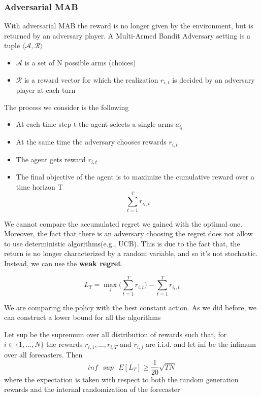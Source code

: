 \documentclass[main.tex]{subfiles}
\begin{document}
\subsubsection{Adversarial MAB}
With adversarial MAB the reward is no longer given by the environment, but is returned by an adversary player. A Multi-Armed Bandit Adversary setting is a tuple $\langle \mathcal{A}, \mathcal{R} \rangle$
\begin{itemize}
    \item $\mathcal{A}$ is a set of N possible arms (choices)
    \item $\mathcal{R}$ is a reward vector for which the realization $r_{i,t}$ is decided by an adversary player at each turn
\end{itemize}
The process we consider is the following
\begin{itemize}
    \item At each time step t the agent selects a single arms $a_{i_t}$
    \item At the same time the adversary chooses rewards $r_{i,t}$
    \item The agent gets reward $r_{i,t}$
    \item The final objective of the agent is to maximize the cumulative reward over a time horizon T
    \begin{equation*}
        \sum_{t=1}^T r_{i_t,t}
    \end{equation*}
\end{itemize}
We cannot compare the accumulated regret we gained with the optimal one. Moreover, the fact that there is an adversary choosing the regret does not allow to use deterministic algorithms(e.g., UCB). This is due to the fact that, the return is no longer characterized by a random variable, and so it's not stochastic. Instead, we can use the \textbf{weak regret}.
\begin{definition}
\begin{equation*}
    L_T = \max_i \bigg( \sum_{t=1}^T r_{i,t} \bigg) - \sum_{t=1}^T r_{i_t,t}
\end{equation*}
\end{definition}
We are comparing the policy with the best constant action.
As we did before, we can construct a lower bound for all the algorithms
\begin{theorem}
Let sup be the supremum over all distribution of rewards such that, for $i \in \{ 1, \dots, N \}$ the rewards $r_{i,1}, \dots, r_{i,T}$ and $r_{i,j}$ are i.i.d. and let inf be the infimum over all forecasters. Then
\begin{equation*}
    inf\text{ }sup\text{ }E[L_T] \geq \frac{1}{20}\sqrt{TN}
\end{equation*}
where the expectation is taken with respect to both the random generation rewards and the internal randomization of the forecaster
\end{theorem}
\end{document}
